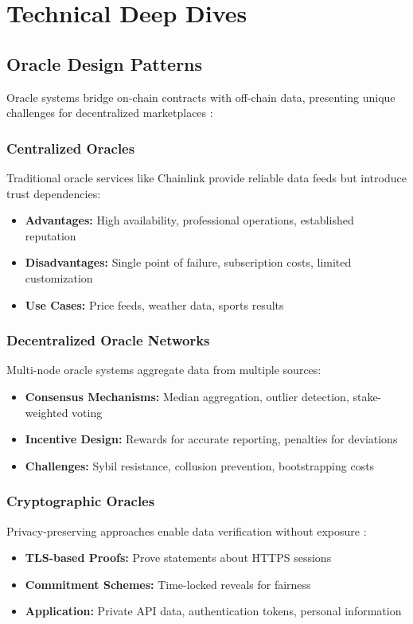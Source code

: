 \section{Technical Deep Dives}

\subsection{Oracle Design Patterns}

Oracle systems bridge on-chain contracts with off-chain data, presenting unique challenges for decentralized marketplaces \citep{albreiki2020trustworthy}:

\subsubsection{Centralized Oracles}
Traditional oracle services like Chainlink provide reliable data feeds but introduce trust dependencies:
\begin{itemize}
    \item \textbf{Advantages:} High availability, professional operations, established reputation
    \item \textbf{Disadvantages:} Single point of failure, subscription costs, limited customization
    \item \textbf{Use Cases:} Price feeds, weather data, sports results
\end{itemize}

\subsubsection{Decentralized Oracle Networks}
Multi-node oracle systems aggregate data from multiple sources:
\begin{itemize}
    \item \textbf{Consensus Mechanisms:} Median aggregation, outlier detection, stake-weighted voting
    \item \textbf{Incentive Design:} Rewards for accurate reporting, penalties for deviations
    \item \textbf{Challenges:} Sybil resistance, collusion prevention, bootstrapping costs
\end{itemize}

\subsubsection{Cryptographic Oracles}
Privacy-preserving approaches enable data verification without exposure \citep{zhang2020deco}:
\begin{itemize}
    \item \textbf{TLS-based Proofs:} Prove statements about HTTPS sessions
    \item \textbf{Commitment Schemes:} Time-locked reveals for fairness
    \item \textbf{Application:} Private API data, authentication tokens, personal information
\end{itemize}

